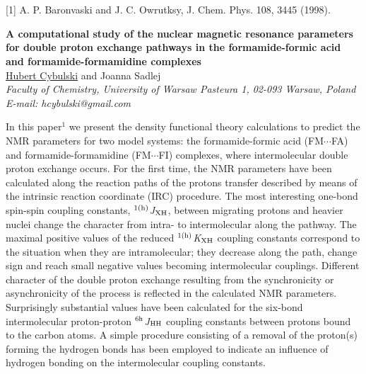 \\
\vspace{0.5cm}
\\
{\footnotesize
[1] A. P. Baronvaski and J. C. Owrutksy, J. Chem. Phys. 108, 3445 (1998).
}
\newpage
\setcounter{figure}{0}
\begin{center}
{\bf \Large
A computational study of the nuclear magnetic resonance parameters
for double proton exchange pathways
in the formamide-formic acid and formamide-formamidine complexes
}
\\
\vspace{0.5cm}
\underline{Hubert Cybulski} and Joanna Sadlej
\\
\vspace{0.5cm}
{\it
Faculty of Chemistry, University of Warsaw
Pasteura 1, 02-093 Warsaw, Poland
}
\\
\vspace{0.5cm}
{\it E-mail: hcybulski@gmail.com}
\\
\vspace{0.5cm}
\end{center}
In this paper$^{1}$ we present the density functional theory calculations
to predict the NMR parameters for two model systems: the formamide-formic acid (FM$\cdots$FA)
and formamide-formamidine (FM$\cdots$FI) complexes, where intermolecular double proton 
exchange occurs. For the first time, the NMR parameters have been calculated along the reaction paths
of the protons transfer described by means of the intrinsic reaction coordinate (IRC) procedure.
The most interesting one-bond spin-spin coupling constants, $^{\rm 1(h)}$\textit{J}$_{\rm XH}$,
between migrating protons and heavier nuclei change the character from intra- to intermolecular
along the pathway.
The maximal positive values of the reduced $^{\rm 1(h)}$\textit{K}$_{\rm XH}$
coupling constants correspond
to the situation when they are intramolecular; they decrease
along the path, change sign and reach small negative values becoming intermolecular couplings.
Different character of the double proton exchange
resulting from the synchronicity or asynchronicity of the process
is reflected in the calculated NMR parameters.
Surprisingly substantial values have been calculated for the six-bond
intermolecular proton-proton $^{\rm 6h}$\textit{J}$_{\rm HH}$ coupling constants
between protons bound to the carbon atoms.
A simple procedure consisting of a removal of the proton(s) forming the hydrogen bonds
has been employed to indicate an influence of hydrogen
bonding on the intermolecular coupling constants.
